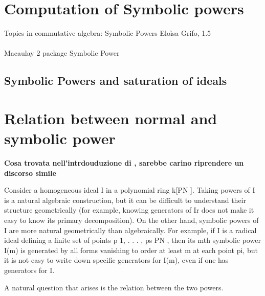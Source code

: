 \documentclass[]{book}
\theoremstyle{plain}
\theoremstyle{remark}
\theoremstyle{definition}
\begin{document}
\section{Computation of Symbolic powers}

\begin{tboxtodo}
Topics in commutative algebra:
Symbolic Powers
Eloìsa Grifo, 1.5 \\
\\
Macaulay 2 package Symbolic Power
\end{tboxtodo}

\subsection{Symbolic Powers and saturation of ideals}


\section{Relation between normal and symbolic power}
\begin{tboxprop}

\textbf{Cosa trovata nell'intrdouduzione di \cite{BocciHrabourne10} , sarebbe carino riprendere un discorso simile}

Consider a homogeneous ideal I in a polynomial ring k[PN ]. Taking powers of I is a natural algebraic construction, but it can be difficult to understand their structure geometrically (for example, knowing generators of Ir does not make it easy to know its primary decomposition). On the other hand, symbolic powers of I are more natural geometrically than algebraically. For example, if I is a radical ideal defining a finite set of points p 1, . . . , ps  PN , then its mth symbolic power I(m) is generated by all forms vanishing to order at least m at each point pi, but it is not easy to write down specific generators for I(m), even if one has generators for I.

A natural question that arises is the relation between the two powers.
\end{tboxprop}
\end{document}
